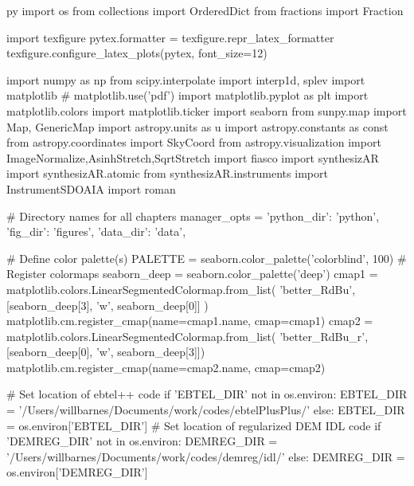 \begin{pythontexcustomcode}{py}
import os
from collections import OrderedDict
from fractions import Fraction

import texfigure
pytex.formatter = texfigure.repr_latex_formatter
texfigure.configure_latex_plots(pytex, font_size=12)

import numpy as np
from scipy.interpolate import interp1d, splev
import matplotlib
# matplotlib.use('pdf')
import matplotlib.pyplot as plt
import matplotlib.colors
import matplotlib.ticker
import seaborn
from sunpy.map import Map, GenericMap
import astropy.units as u
import astropy.constants as const
from astropy.coordinates import SkyCoord
from astropy.visualization import ImageNormalize,AsinhStretch,SqrtStretch
import fiasco
import synthesizAR
import synthesizAR.atomic
from synthesizAR.instruments import InstrumentSDOAIA
import roman

# Directory names for all chapters
manager_opts = {'python_dir': 'python', 'fig_dir': 'figures', 'data_dir': 'data',}

# Define color palette(s)
PALETTE = seaborn.color_palette('colorblind', 100)
#  Register colormaps
seaborn_deep = seaborn.color_palette('deep')
cmap1 = matplotlib.colors.LinearSegmentedColormap.from_list(
    'better_RdBu', [seaborn_deep[3], 'w', seaborn_deep[0]]
)
matplotlib.cm.register_cmap(name=cmap1.name, cmap=cmap1)
cmap2 = matplotlib.colors.LinearSegmentedColormap.from_list(
    'better_RdBu_r', [seaborn_deep[0], 'w', seaborn_deep[3]])
matplotlib.cm.register_cmap(name=cmap2.name, cmap=cmap2)

# Set location of ebtel++ code
if 'EBTEL_DIR' not in os.environ:
	EBTEL_DIR = '/Users/willbarnes/Documents/work/codes/ebtelPlusPlus/'
else:
	EBTEL_DIR = os.environ['EBTEL_DIR']
# Set location of regularized DEM IDL code
if 'DEMREG_DIR' not in os.environ:
	DEMREG_DIR = '/Users/willbarnes/Documents/work/codes/demreg/idl/'
else:
	DEMREG_DIR = os.environ['DEMREG_DIR']


\end{pythontexcustomcode}
